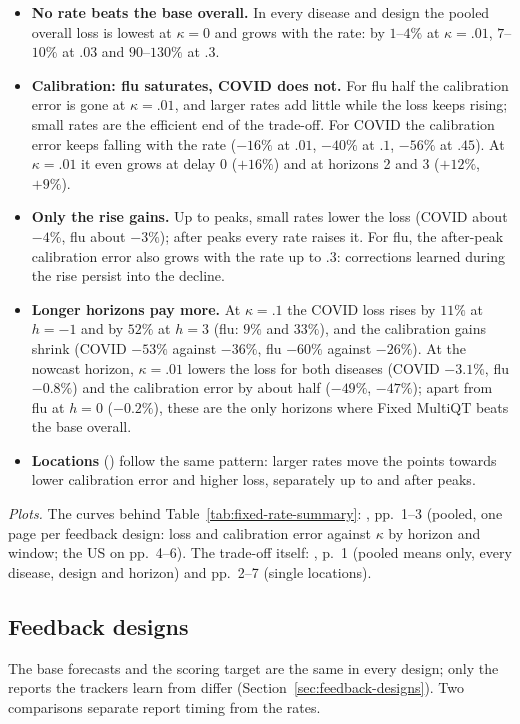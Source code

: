 \documentclass[11pt,a4paper]{article}
\theoremstyle{definition}
\theoremstyle{remark}
\begin{document}
\begin{itemize}[leftmargin=*,itemsep=3pt]
\item \textbf{No rate beats the base overall.} In every disease and
design the pooled overall loss is lowest at $\kappa=0$ and grows with the
rate: by $1$--$4\%$ at $\kappa=.01$, $7$--$10\%$ at $.03$ and
$90$--$130\%$ at $.3$.
\item \textbf{Calibration: flu saturates, COVID does not.} For flu half
the calibration error is gone at $\kappa=.01$, and larger rates add
little while the loss keeps rising; small rates are the efficient end of
the trade-off. For COVID the calibration error keeps falling with the
rate ($-16\%$ at $.01$, $-40\%$ at $.1$, $-56\%$ at $.45$). At $\kappa=.01$
it even grows at delay 0 ($+16\%$) and at horizons 2 and 3 ($+12\%$,
$+9\%$).
\item \textbf{Only the rise gains.} Up to peaks, small rates lower the
loss (COVID about $-4\%$, flu about $-3\%$); after peaks every rate raises
it. For flu, the after-peak calibration error also grows with the rate up
to $.3$: corrections learned during the rise persist into the decline.
\item \textbf{Longer horizons pay more.} At $\kappa=.1$ the COVID loss
rises by $11\%$ at $h=-1$ and by $52\%$ at $h=3$ (flu: $9\%$ and $33\%$),
and the calibration gains shrink (COVID $-53\%$ against $-36\%$, flu
$-60\%$ against $-26\%$). At the nowcast horizon, $\kappa=.01$ lowers the
loss for both diseases (COVID $-3.1\%$, flu $-0.8\%$) and the
calibration error by about half ($-49\%$, $-47\%$); apart from flu at
$h=0$ ($-0.2\%$), these are the only horizons where Fixed MultiQT beats
the base overall.
\item \textbf{Locations} () follow the
same pattern: larger rates move the points towards lower calibration
error and higher loss, separately up to and after peaks.
\end{itemize}
\emph{Plots.} The curves behind Table~\ref{tab:fixed-rate-summary}:
, pp.~1--3 (pooled, one page per
feedback design: loss and calibration error against $\kappa$ by horizon
and window; the US on pp.~4--6). The trade-off itself:
, p.~1 (pooled means only, every
disease, design and horizon) and pp.~2--7 (single locations).

\subsection{Feedback designs}
\label{sec:results-feedback}
The base forecasts and the scoring target are the same in every design;
only the reports the trackers learn from differ
(Section~\ref{sec:feedback-designs}). Two comparisons separate report
timing from the rates.
\end{document}
